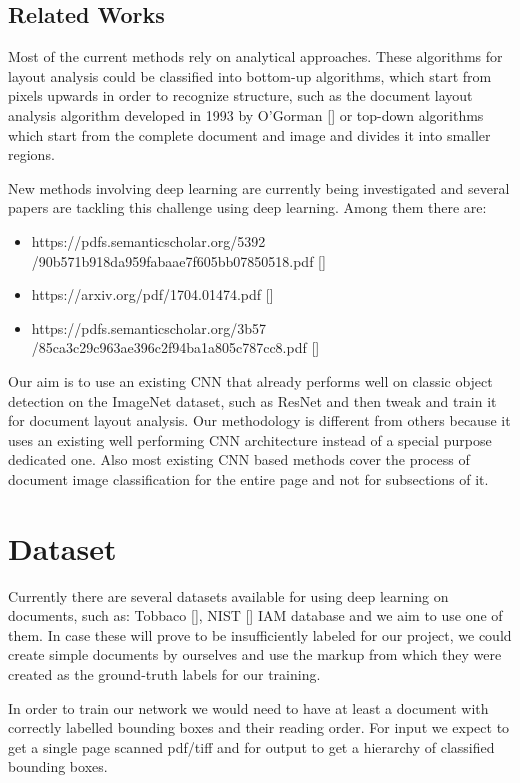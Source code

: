 \documentclass[10pt,twocolumn,letterpaper]{article}
\begin{document}
\subsection{Related Works}
Most of the current methods rely on analytical approaches. These algorithms for layout analysis could be classified into bottom-up algorithms, which start from pixels upwards in order to recognize structure, such as the document layout analysis algorithm developed in 1993 by O'Gorman [] or top-down algorithms which start from the complete document and image and divides it into smaller regions.

New methods involving deep learning are currently being investigated and several papers are tackling this challenge using deep learning. Among them there are:
\begin{itemize}
	\item https://pdfs.semanticscholar.org/5392 /90b571b918da959fabaae7f605bb07850518.pdf []
	\item https://arxiv.org/pdf/1704.01474.pdf []
	\item https://pdfs.semanticscholar.org/3b57 /85ca3c29c963ae396c2f94ba1a805c787cc8.pdf []
\end{itemize}

Our aim is to use an existing CNN that already performs well on classic object detection on the ImageNet dataset, such as ResNet and then tweak and train it for document layout analysis. Our methodology is different from others because it uses an existing well performing CNN architecture instead of a special purpose dedicated one. Also most existing CNN based methods cover the process of document image classification for the entire page and not for subsections of it.

\section{Dataset}
Currently there are several datasets available for using deep learning on documents, such as: Tobbaco [], NIST [] IAM database and we aim to use one of them. In case these will prove to be insufficiently labeled for our project, we could create simple documents by ourselves and use the markup from which they were created as the ground-truth labels for our training. 

In order to train our network we would need to have at least a document with correctly labelled bounding boxes and their reading order. For input we expect to get a single page scanned pdf/tiff and for output to get a hierarchy of classified bounding boxes.
\end{document}
